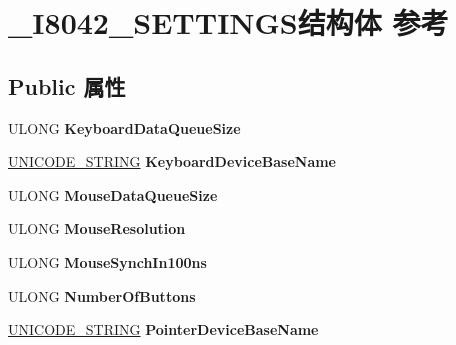 \hypertarget{struct___i8042___s_e_t_t_i_n_g_s}{}\section{\+\_\+\+I8042\+\_\+\+S\+E\+T\+T\+I\+N\+G\+S结构体 参考}
\label{struct___i8042___s_e_t_t_i_n_g_s}
\subsection*{Public 属性}
\begin{DoxyCompactItemize}
\item 
\mbox{\label{struct___i8042___s_e_t_t_i_n_g_s_ae80689d42caf875d0ff48a5cbcd65d4d}} 
U\+L\+O\+NG {\bfseries Keyboard\+Data\+Queue\+Size}
\item 
\mbox{\label{struct___i8042___s_e_t_t_i_n_g_s_a434deaea1310846ea871ad5c4d7e0501}} 
\hyperlink{struct___u_n_i_c_o_d_e___s_t_r_i_n_g}{U\+N\+I\+C\+O\+D\+E\+\_\+\+S\+T\+R\+I\+NG} {\bfseries Keyboard\+Device\+Base\+Name}
\item 
\mbox{\label{struct___i8042___s_e_t_t_i_n_g_s_a324615441c18a1b10caf22d8350b2d17}} 
U\+L\+O\+NG {\bfseries Mouse\+Data\+Queue\+Size}
\item 
\mbox{\label{struct___i8042___s_e_t_t_i_n_g_s_aeea2e55b6ffeac09a448b3a9c782b580}} 
U\+L\+O\+NG {\bfseries Mouse\+Resolution}
\item 
\mbox{\label{struct___i8042___s_e_t_t_i_n_g_s_aeb6217bdbea3c6f92e93d031431f1661}} 
U\+L\+O\+NG {\bfseries Mouse\+Synch\+In100ns}
\item 
\mbox{\label{struct___i8042___s_e_t_t_i_n_g_s_a1a83c9a8fcb1d56c8f52d22cdc877710}} 
U\+L\+O\+NG {\bfseries Number\+Of\+Buttons}
\item 
\mbox{\label{struct___i8042___s_e_t_t_i_n_g_s_ac2236bd681c5bb96ddd9e3a8ece6e4ff}} 
\hyperlink{struct___u_n_i_c_o_d_e___s_t_r_i_n_g}{U\+N\+I\+C\+O\+D\+E\+\_\+\+S\+T\+R\+I\+NG} {\bfseries Pointer\+Device\+Base\+Name}

\end{DoxyCompactItemize}
